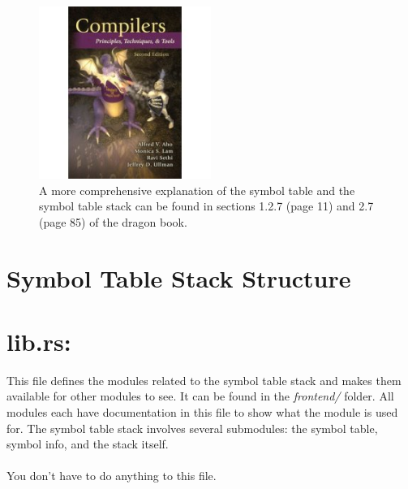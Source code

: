 \documentclass[
	12pt, %
]{fphw}
\begin{document}
\begin{figure}[h!]
    \centering
    \includegraphics[width=0.5\textwidth]{dragon.jpeg}
    \caption{A more comprehensive explanation of the symbol table and the symbol table stack can be found in sections 1.2.7 (page 11) and 2.7 (page 85) of the dragon book.}
    \label{fig:sts_structure}
\end{figure}
\pagebreak

\section*{Symbol Table Stack Structure}



\section*{lib.rs:}
This file defines the modules related to the symbol table stack and makes them available for other modules to see. It can be found in the \textit{frontend/} folder. All modules each have documentation in this file to show what the module is used for. The symbol table stack involves several submodules: the symbol table, symbol info, and the stack itself.\\
\\
You don't have to do anything to this file.
\end{document}
